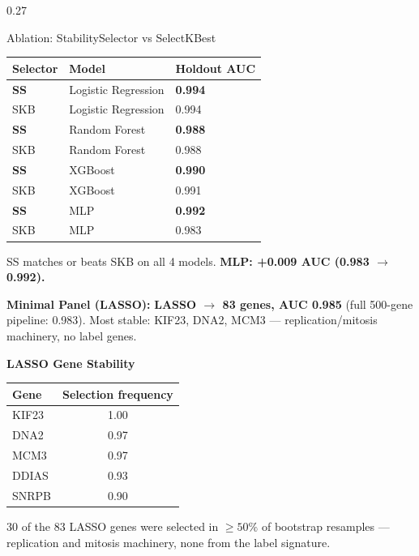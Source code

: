 \documentclass[final]{beamer}
\begin{document}
\begin{frame}[t]
\begin{columns}[t]
\begin{column}{0.27\textwidth}
\begin{block}{Ablation: StabilitySelector vs SelectKBest}
\begin{center}
\small
\begin{tabular}{lll}
\toprule
Selector & Model & Holdout AUC \\
\midrule
\textbf{SS} & Logistic Regression & \textbf{0.994} \\
SKB & Logistic Regression & 0.994 \\
\textbf{SS} & Random Forest & \textbf{0.988} \\
SKB & Random Forest & 0.988 \\
\textbf{SS} & XGBoost & \textbf{0.990} \\
SKB & XGBoost & 0.991 \\
\textbf{SS} & MLP & \textbf{0.992} \\
SKB & MLP & 0.983 \\
\bottomrule
\end{tabular}
\end{center}

SS matches or beats SKB on all 4 models. \textbf{MLP: +0.009 AUC (0.983 $\rightarrow$ 0.992).}

\vspace{0.1cm}
\textbf{Minimal Panel (LASSO):} \textbf{LASSO $\rightarrow$ 83 genes, AUC 0.985} (full 500-gene pipeline: 0.983). Most stable: KIF23, DNA2, MCM3 --- replication/mitosis machinery, no label genes.

\vspace{0.1cm}
\textbf{LASSO Gene Stability}
\begin{center}
\small
\begin{tabular}{lc}
\toprule
Gene & Selection frequency \\
\midrule
KIF23 & 1.00 \\
DNA2 & 0.97 \\
MCM3 & 0.97 \\
DDIAS & 0.93 \\
SNRPB & 0.90 \\
\bottomrule
\end{tabular}
\end{center}
30 of the 83 LASSO genes were selected in $\geq 50\%$ of bootstrap resamples --- replication and mitosis machinery, none from the label signature.
\end{block}

\vspace*{0.15cm}


\end{column}
\end{columns}
\end{frame}
\end{document}

